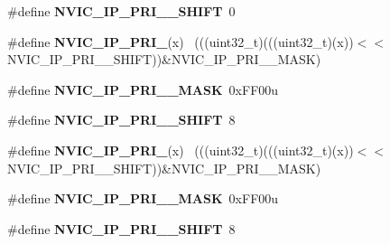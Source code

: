 \begin{DoxyCompactItemize}
\item 
\hypertarget{group___n_v_i_c___register___masks_gaeb17cee4dd52ffd4c4846ea19af863e0}{}\#define {\bfseries N\+V\+I\+C\+\_\+\+I\+P\+\_\+\+P\+R\+I\+\_\+\_\+\+S\+H\+I\+F\+T}~0\label{group___n_v_i_c___register___masks_gaeb17cee4dd52ffd4c4846ea19af863e0}

\item 
\hypertarget{group___n_v_i_c___register___masks_gab52bbc27d553e2fc5385356f73db076e}{}\#define {\bfseries N\+V\+I\+C\+\_\+\+I\+P\+\_\+\+P\+R\+I\+\_}(x)                                              ~(((uint32\+\_\+t)(((uint32\+\_\+t)(x))$<$$<$N\+V\+I\+C\+\_\+\+I\+P\+\_\+\+P\+R\+I\+\_\+\_\+\+S\+H\+I\+F\+T))\&N\+V\+I\+C\+\_\+\+I\+P\+\_\+\+P\+R\+I\+\_\+\_\+\+M\+A\+S\+K)\label{group___n_v_i_c___register___masks_gab52bbc27d553e2fc5385356f73db076e}

\item 
\hypertarget{group___n_v_i_c___register___masks_ga96377193746acdc9f77fef1aa939d7e8}{}\#define {\bfseries N\+V\+I\+C\+\_\+\+I\+P\+\_\+\+P\+R\+I\+\_\+\_\+\+M\+A\+S\+K}~0x\+F\+F00u\label{group___n_v_i_c___register___masks_ga96377193746acdc9f77fef1aa939d7e8}

\item 
\hypertarget{group___n_v_i_c___register___masks_ga3f0d1e7120ac37c4a4b926c8d770f3bf}{}\#define {\bfseries N\+V\+I\+C\+\_\+\+I\+P\+\_\+\+P\+R\+I\+\_\+\_\+\+S\+H\+I\+F\+T}~8\label{group___n_v_i_c___register___masks_ga3f0d1e7120ac37c4a4b926c8d770f3bf}

\item 
\hypertarget{group___n_v_i_c___register___masks_ga033decd6a160349c921bab88cbf716da}{}\#define {\bfseries N\+V\+I\+C\+\_\+\+I\+P\+\_\+\+P\+R\+I\+\_}(x)                                            ~(((uint32\+\_\+t)(((uint32\+\_\+t)(x))$<$$<$N\+V\+I\+C\+\_\+\+I\+P\+\_\+\+P\+R\+I\+\_\+\_\+\+S\+H\+I\+F\+T))\&N\+V\+I\+C\+\_\+\+I\+P\+\_\+\+P\+R\+I\+\_\+\_\+\+M\+A\+S\+K)\label{group___n_v_i_c___register___masks_ga033decd6a160349c921bab88cbf716da}

\item 
\hypertarget{group___n_v_i_c___register___masks_ga259260406aa11f2b8002e534df7b795e}{}\#define {\bfseries N\+V\+I\+C\+\_\+\+I\+P\+\_\+\+P\+R\+I\+\_\+\_\+\+M\+A\+S\+K}~0x\+F\+F00u\label{group___n_v_i_c___register___masks_ga259260406aa11f2b8002e534df7b795e}

\item 
\hypertarget{group___n_v_i_c___register___masks_gabe52ee1ab77a911455477981fc660657}{}\#define {\bfseries N\+V\+I\+C\+\_\+\+I\+P\+\_\+\+P\+R\+I\+\_\+\_\+\+S\+H\+I\+F\+T}~8\label{group___n_v_i_c___register___masks_gabe52ee1ab77a911455477981fc660657}


\end{DoxyCompactItemize}
